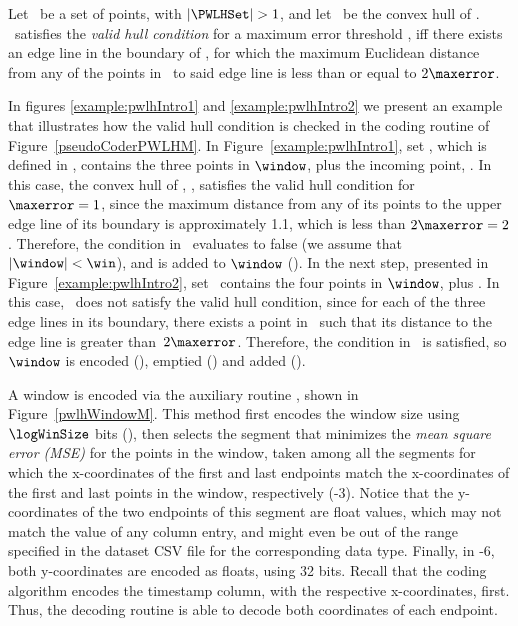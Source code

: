 \vspace{+5pt}
\begin{defcion}
\label{def:validHull}
Let \PWLHSet\ be a set of points, with $|\PWLHSet|>1$, and let \hull\ be the convex hull of \PWLHSet. \hull\ satisfies the \textit{valid hull condition} for a maximum error threshold \maxerror, iff there exists an edge line in the boundary of \hull, for which the maximum Euclidean distance from any of the points in \hull\ to said edge line is less than or equal to $2\maxerror$.
\end{defcion}

\newcommand{\condLinePWLH}{\Line 12}
In figures \ref{example:pwlhIntro1} and \ref{example:pwlhIntro2} we present an example that illustrates how the valid hull condition is checked in the coding routine of Figure~\ref{pseudoCoderPWLHM}. In Figure~\ref{example:pwlhIntro1}, set \PWLHSet, which is defined in , contains the three points in $\window$, plus the incoming point, . In this case, the convex hull of \PWLHSet, \hull, satisfies the valid hull condition for $\maxerror = 1$, since the maximum distance from any of its points to the upper edge line of its boundary is approximately 1.1, which is less than $2\maxerror = 2$. Therefore, the condition in \condLinePWLH\ evaluates to false (we assume that $|\window|<\win$), and  is added to $\window$ (). In the next step, presented in Figure~\ref{example:pwlhIntro2}, set \PWLHSet\ contains the four points in $\window$, plus . In this case, \hull\ does not satisfy the valid hull condition, since for each of the three edge lines in its boundary, there exists a point in \hull\ such that its distance to the edge line is greater than~$2\maxerror$. Therefore, the condition in \condLinePWLH\ is satisfied, so $\window$ is encoded (), emptied () and added  ().


\vspace{+5pt}
\examplePWLH


\vspace{+5pt}
A window is encoded via the auxiliary routine \EncodeWindow, shown in Figure~\ref{pwlhWindowM}. This method first encodes the window size using $\logWinSize$ bits (), then selects the segment that minimizes the \textit{mean square error (MSE)} for the points in the window, taken among all the segments for which the x-coordinates of the first and last endpoints match the x-coordinates of the first and last points in the window, respectively (-3). Notice that the y-coordinates of the two endpoints of this segment are float values, which may not match the value of any column entry, and might even be out of the range specified in the dataset CSV file for the corresponding data type. Finally, in -6, both y-coordinates are encoded as floats, using 32 bits. Recall that the coding algorithm encodes the timestamp column, with the respective x-coordinates, first. Thus, the decoding routine is able to decode both coordinates of each endpoint.


